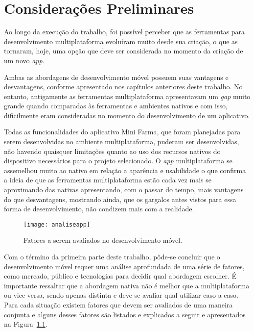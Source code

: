 \chapter{Considerações Preliminares} \label{cap:consideracoespreliminares}

Ao longo da execução do trabalho, foi possível perceber que as ferramentas para desenvolvimento multiplataforma 
evoluíram muito desde sua criação, o que as tornaram, hoje, uma opção que deve ser considerada no momento da criação de um novo \textit{app}.

Ambas as abordagens de desenvolvimento móvel possuem suas vantagens e desvantagens, conforme apresentado nos capítulos anteriores deste trabalho. 
No entanto, antigamente as ferramentas multiplataforma apresentavam um \textit{gap} muito grande quando comparadas às ferramentas e ambientes nativos e com isso, 
dificilmente eram consideradas no momento do desenvolvimento de um aplicativo.

Todas as funcionalidades do aplicativo Mini Farma, que foram planejadas para serem desenvolvidas no ambiente multiplataforma, puderam ser desenvolvidas, não havendo quaisquer limitações 
quanto ao uso dos recursos nativos do dispositivo necessários para o projeto selecionado. O \textit{app} multiplataforma se assemelhou muito 
ao nativo em relação a aparência e usabilidade o que confirma a ideia de que as ferramentas multiplataforma estão cada vez mais se aproximando
das nativas apresentando, com o passar do tempo, mais vantagens do que desvantagens, mostrando ainda, que os gargalos antes vistos para essa forma de desenvolvimento, não condizem
mais com a realidade.

\begin{figure}[H]
	\centering
	\texttt{[image: analiseapp]}
	\caption[Fatores a serem avaliados no desenvolvimento móvel]{ Fatores a serem avaliados no desenvolvimento móvel.}
	\label{fig:analiseapp}
\end{figure}

Com o término da primeira parte deste trabalho, pôde-se concluir que o desenvolvimento móvel requer uma análise aprofundada de uma série de fatores, 
como mercado, público e tecnologias para decidir qual abordagem escolher.
É importante ressaltar que a abordagem nativa não é melhor que a multiplataforma ou vice-versa, sendo apenas distinta e deve-se avaliar qual utilizar caso a 
caso. Para cada situação existem fatores que devem ser avaliados de uma maneira conjunta e alguns desses fatores são listados e explicados a seguir e apresentados na Figura~\ref{fig:analiseapp}.

